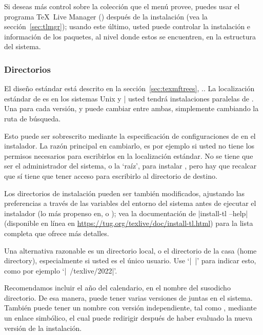 \documentclass{article}
\begin{document}
Si deseas más control sobre la colección que el menú provee, puedes
usar el programa \TeX\ Live Manager () después de la
instalación (vea la sección~\ref{sec:tlmgr}); usando este último,
usted puede controlar la instalación e información de los paquetes, al
nivel donde estos se encuentren, en la estructura del sistema.

\subsubsection{Directorios}
\label{sec:directories}

El diseño estándar está descrito en la sección~\ref{sec:texmftrees},
\p.\pageref{sec:texmftrees}. La localización estándar de
 es  en los sistemas
Unix y |%
usted tendrá instalaciones paralelas de \TL. Una para cada versión, y puede
cambiar entre ambas, simplemente cambiando la ruta de búsqueda. 

Esto puede ser sobrescrito mediante la especificación de
configuraciones
de  en el instalador. La razón principal en cambiarlo,
es por ejemplo si usted no tiene los permisos necesarios para
escribirlos en la localización estándar. No se tiene que ser el
administrador del sistema, o la `raíz', para instalar \TL, pero hay que recalcar que sí
tiene que tener acceso para escribirlo al directorio de destino. 

Los directorios de instalación pueden ser también modificados, ajustando las preferencias a través de las variables del entorno del sistema antes de ejecutar el instalador (lo más propenso en, 
 o
); vea la documentación de 
|install-tl --help| (disponible en línea en
\url{https://tug.org/texlive/doc/install-tl.html}) para la lista completa que ofrece más detalles.

Una alternativa razonable es un directorio local, o el
directorio de la casa (home directory), especialmente si
usted es el único usuario. Use `|~|' para indicar esto, como
por ejemplo `|~/texlive/2022|'.

Recomendamos incluir el año del calendario, en el nombre del susodicho
directorio. De esa manera, puede tener varias versiones de \TL{}
juntas en el sistema. También puede tener un nombre con versión
independiente, tal como , mediante un
enlace simbólico, el cual puede redirigir después de haber evaluado la
nueva versión de la instalación.
\end{document}
